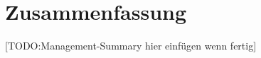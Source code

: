 \chapter{Zusammenfassung}
\label{chap:summary}


[TODO:\@ Management-Summary hier einfügen wenn fertig]
